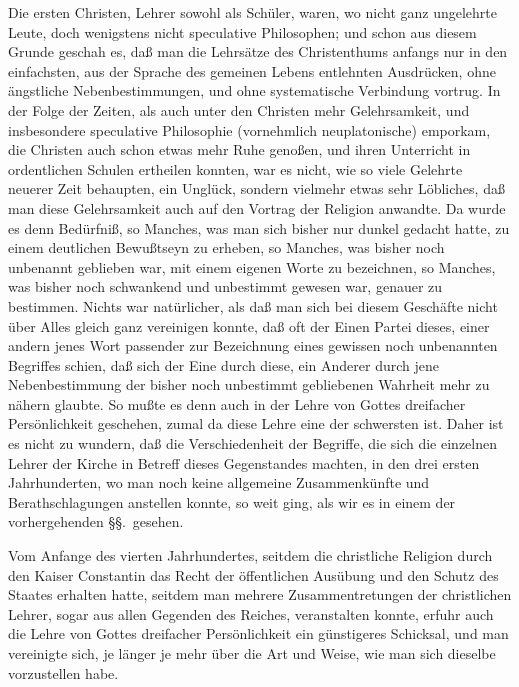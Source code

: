 
\begin{aufza}
\item Die ersten Christen, Lehrer sowohl als Schüler, waren, wo nicht ganz ungelehrte Leute, doch wenigstens nicht speculative Philosophen; und schon aus diesem Grunde geschah es, daß man die Lehrsätze des Christenthums anfangs nur in den einfachsten, aus der Sprache des gemeinen Lebens entlehnten Ausdrücken, ohne ängstliche Nebenbestimmungen, und ohne systematische Verbindung vortrug. In der Folge der Zeiten, als auch unter den Christen mehr Gelehrsamkeit, und insbesondere speculative Philosophie (vornehmlich neuplatonische) emporkam, die Christen auch schon etwas mehr Ruhe genoßen, und ihren Unterricht in ordentlichen Schulen ertheilen konnten, war es nicht, wie so viele Gelehrte neuerer Zeit behaupten, ein Unglück, sondern vielmehr etwas sehr Löbliches, daß man diese Gelehrsamkeit auch auf den Vortrag der Religion anwandte. Da wurde es denn Bedürfniß, so Manches, was man sich bisher nur dunkel gedacht hatte, zu einem deutlichen Bewußtseyn zu erheben, so Manches, was bisher noch unbenannt geblieben war, mit einem eigenen Worte zu bezeichnen, so Manches, was bisher noch schwankend und unbestimmt gewesen war, genauer zu bestimmen. Nichts war natürlicher, als daß man sich bei diesem Geschäfte nicht über Alles gleich ganz vereinigen konnte, daß oft der Einen Partei dieses, einer andern jenes Wort passender zur Bezeichnung eines gewissen noch unbenannten Begriffes schien, daß sich der Eine durch diese, ein Anderer durch jene Nebenbestimmung der bisher noch unbestimmt gebliebenen Wahrheit mehr zu nähern glaubte. So mußte es denn auch in der Lehre von Gottes dreifacher Persönlichkeit geschehen, zumal da diese Lehre eine der schwersten ist. Daher ist es nicht zu wundern, daß die Verschiedenheit der Begriffe, die sich die einzelnen Lehrer der Kirche in Betreff dieses Gegenstandes machten, in den drei ersten Jahrhunderten, wo man noch keine allgemeine Zusammenkünfte und Berathschlagungen anstellen konnte, so weit ging, als wir es in einem der vorhergehenden §§.\ gesehen.~
\item Vom Anfange des vierten Jahrhundertes, seitdem die christliche Religion durch den Kaiser Constantin das Recht der öffentlichen Ausübung und den Schutz des Staates erhalten hatte, seitdem man mehrere Zusammentretungen der christlichen Lehrer, sogar aus allen Gegenden des Reiches, veranstalten konnte, erfuhr auch die Lehre von Gottes dreifacher Persönlichkeit ein günstigeres Schicksal, und man vereinigte sich, je länger je mehr über die Art und Weise, wie man sich dieselbe vorzustellen habe.

\end{aufza}
